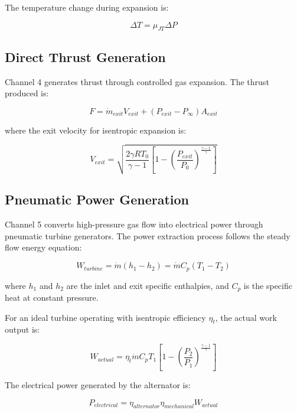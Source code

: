 \documentclass[12pt,a4paper]{article}
\begin{document}
The temperature change during expansion is:

\begin{equation}
\Delta T = \mu_{JT} \Delta P
\end{equation}

\subsection{Direct Thrust Generation}

Channel 4 generates thrust through controlled gas expansion. The thrust produced is:

\begin{equation}
F = \dot{m}_{exit} V_{exit} + (P_{exit} - P_\infty) A_{exit}
\end{equation}

where the exit velocity for isentropic expansion is:

\begin{equation}
V_{exit} = \sqrt{\frac{2\gamma RT_0}{\gamma-1}\left[1 - \left(\frac{P_{exit}}{P_0}\right)^{\frac{\gamma-1}{\gamma}}\right]}
\end{equation}

\subsection{Pneumatic Power Generation}

Channel 5 converts high-pressure gas flow into electrical power through pneumatic turbine generators. The power extraction process follows the steady flow energy equation:

\begin{equation}
W_{turbine} = \dot{m}\left(h_1 - h_2\right) = \dot{m}C_p(T_1 - T_2)
\end{equation}

where $h_1$ and $h_2$ are the inlet and exit specific enthalpies, and $C_p$ is the specific heat at constant pressure.

For an ideal turbine operating with isentropic efficiency $\eta_t$, the actual work output is:

\begin{equation}
W_{actual} = \eta_t \dot{m}C_p T_1 \left[1 - \left(\frac{P_2}{P_1}\right)^{\frac{\gamma-1}{\gamma}}\right]
\end{equation}

The electrical power generated by the alternator is:

\begin{equation}
P_{electrical} = \eta_{alternator} \eta_{mechanical} W_{actual}
\end{equation}
\end{document}
